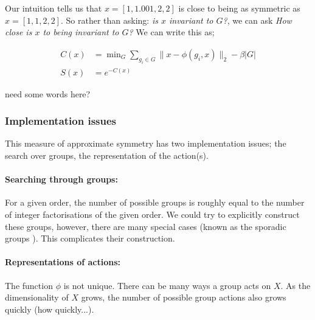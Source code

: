 Our intuition tells us that $x = [1,1.001,2,2]$ is close to being as symmetric as
$x = [1,1,2,2]$. So rather than asking: \textit{is $x$ invariant to $G$?}, we can ask
\textit{How close is $x$ to being invariant to $G$?} We can write this as;


\begin{align*}
C(x) &= \mathop{\text{min}}_G \sum_{g_i\in G}\parallel x-\phi(g_i, x)\parallel_2 - \beta |G|\\
S(x) &= e^{-C(x)}
\end{align*}


{\color{red}need some words here?}

\subsubsection{Implementation issues}

This measure of approximate symmetry has two implementation issues;
the search over groups, the representation of the action(s).

\paragraph{Searching through groups:}\label{searching-through-groups} For a given order, the number of possible
groups is roughly equal to the number of integer factorisations of the given order.
We could try to explicitly construct these groups, however, there are many special cases (known as the sporadic groups \cite{Conway1985}).
This complicates their construction\footnotemark[38].




\paragraph{Representations of actions:} The function $\phi$ is not unique. There can be many ways
a group acts on $X$. As the dimensionality of $X$ grows, the number of possible group actions also grows quickly {\color{red}(how quickly...)}.

